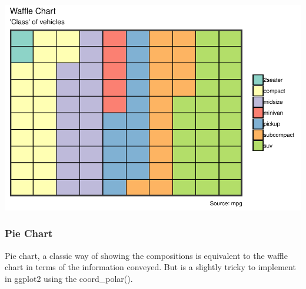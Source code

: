 \documentclass[a4paper]{article}
\begin{document}
\includegraphics{M24-ggplot2_Gallery_files/figure-latex/unnamed-chunk-32-1.pdf}

\newpage  

\subsubsection{Pie Chart}\label{pie-chart}

Pie chart, a classic way of showing the compositions is equivalent to
the waffle chart in terms of the information conveyed. But is a slightly
tricky to implement in ggplot2 using the coord\_polar().
\end{document}
